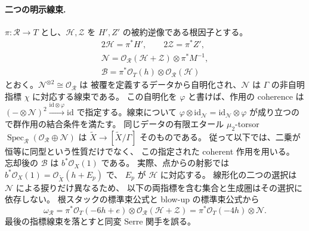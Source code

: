 \paragraph{二つの明示線束.}
$\pi:\mathcal R\to T$ とし、$\mathcal H,\mathcal Z$ を
$H',Z'$ の被約逆像である根因子とする。
\[
 \begin{gathered}
 2\mathcal H=\pi^*H',\qquad
 2\mathcal Z=\pi^*Z',\\
 \mathcal N=\mathcal O_{\mathcal R}(\mathcal H+\mathcal Z)
                   \otimes\pi^*M^{-1},\\
 \mathcal B=\pi^*\mathcal O_T(h)\otimes
                   \mathcal O_{\mathcal R}(\mathcal H)
 \end{gathered}
\]
とおく。$\mathcal N^{\otimes2}\cong\mathcal O_{\mathcal R}$ は
被覆を定義するデータから自明化され、$\mathcal N$ は
$\Gamma$ の非自明指標 $\chi$ に対応する線束である。
この自明化を $\varphi$ と書けば、作用の coherence は
$(-\otimes\mathcal N)^2\xrightarrow{\mathrm{id}\otimes\varphi}\mathrm{id}$
で指定する。線束について
$\varphi\otimes\mathrm{id}_{\mathcal N}
=\mathrm{id}_{\mathcal N}\otimes\varphi$
が成り立つので群作用の結合条件を満たす。
同じデータの有限エタール $\mu_2$-torsor
$\operatorname{Spec}_{\mathcal R}(\mathcal O_{\mathcal R}\oplus\mathcal N)$
は $\widetilde X\to[\widetilde X/\Gamma]$ そのものである。
従って以下では、二乗が恒等に同型という性質だけでなく、
この指定された coherent 作用を用いる。
忘却後の $\mathcal B$ は $b^*\mathcal O_X(1)$ である。
実際、点からの射影では
$b^*\mathcal O_X(1)=\mathcal O_{\widetilde X}(h+E_p)$ で、
$E_p$ が $\mathcal H$ に対応する。
線形化の二つの選択は $\mathcal N$ による捩りだけ異なるため、
以下の両指標を含む集合と生成圏はその選択に依存しない。
根スタックの標準束公式と blow-up の標準束公式から
\begin{equation}
\label{cmo:eq:root-canonical-sign}
 \omega_{\mathcal R}
 =\pi^*\mathcal O_T(-6h+e)
      \otimes\mathcal O_{\mathcal R}(\mathcal H+\mathcal Z)
 =\pi^*\mathcal O_T(-4h)\otimes\mathcal N.
\end{equation}
最後の指標線束を落とすと同変 Serre 関手を誤る。

